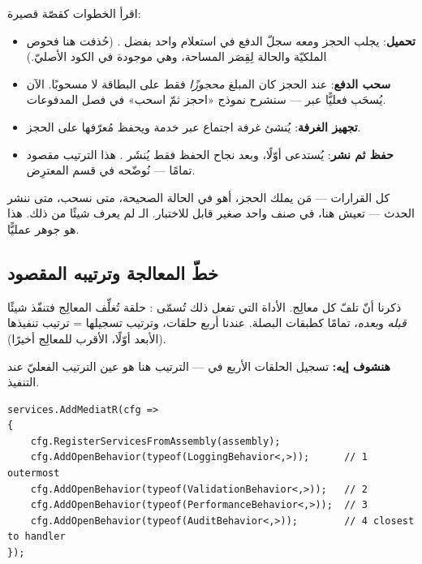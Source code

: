 اقرأ الخطوات كقصّة قصيرة:
\begin{itemize}
\item \textbf{تحميل}: يجلب الحجز ومعه سجلّ الدفع  في استعلام واحد بفضل
  . (حُذفت هنا فحوص الملكيّة والحالة لِقِصَر المساحة، وهي موجودة في الكود
  الأصليّ.)
\item \textbf{سحب الدفع}: عند الحجز كان المبلغ \emph{محجوزًا} فقط على البطاقة لا مسحوبًا.
  الآن يُسحَب فعليًّا عبر  — سنشرح نموذج «احجز ثمّ اسحب»
  في فصل المدفوعات.
\item \textbf{تجهيز الغرفة}: يُنشئ غرفة اجتماع عبر خدمة  ويحفظ مُعرّفها على الحجز.
\item \textbf{حفظ ثم نشر}: يُستدعى  أوّلًا، وبعد نجاح الحفظ فقط
  يُنشَر . هذا الترتيب مقصود تمامًا — نُوضّحه في قسم المعترِض.
\end{itemize}

\begin{keyp}
كل القرارات — مَن يملك الحجز، أهو في الحالة الصحيحة، متى نسحب، متى ننشر الحدث — تعيش
هنا، في صنف واحد صغير قابل للاختبار. الـ  لم يعرف شيئًا من ذلك. هذا هو
جوهر  عمليًّا.
\end{keyp}

\subsection{خطّ المعالجة وترتيبه المقصود}

ذكرنا أنّ  تلفّ كل معالِج. الأداة التي تفعل ذلك تُسمّى :
حلقة تُغلِّف المعالِج فتنفّذ شيئًا \emph{قبله} و\emph{بعده}، تمامًا كطبقات البصلة. عندنا
أربع حلقات، وترتيب تسجيلها = ترتيب تنفيذها (الأبعد أوّلًا، الأقرب للمعالِج أخيرًا).

\textbf{هنشوف إيه:} تسجيل الحلقات الأربع في  — الترتيب هنا هو
عين الترتيب الفعليّ عند التنفيذ.

\begin{english}
\begin{lstlisting}[language={[Sharp]C}]
services.AddMediatR(cfg =>
{
    cfg.RegisterServicesFromAssembly(assembly);
    cfg.AddOpenBehavior(typeof(LoggingBehavior<,>));      // 1 outermost
    cfg.AddOpenBehavior(typeof(ValidationBehavior<,>));   // 2
    cfg.AddOpenBehavior(typeof(PerformanceBehavior<,>));  // 3
    cfg.AddOpenBehavior(typeof(AuditBehavior<,>));        // 4 closest to handler
});
\end{lstlisting}
\end{english}

